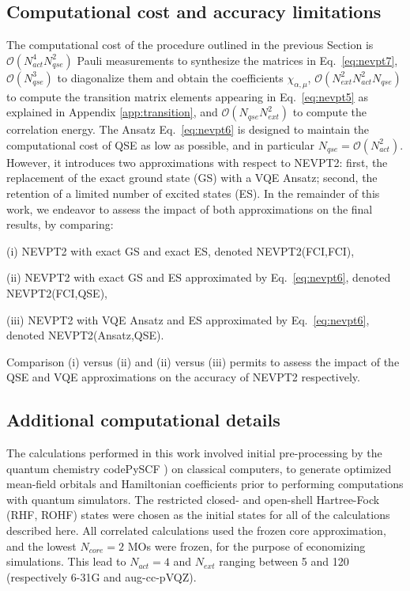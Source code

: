 \documentclass[aps,pra,twocolumn]{revtex4-2}
\begin{document}
\subsection{Computational cost and accuracy limitations}

The computational cost of the procedure outlined in the previous Section is 
$\mathcal{O}(N_{act}^4 N_{qse}^2)$ Pauli measurements to synthesize the matrices in Eq.~\eqref{eq:nevpt7},
$\mathcal{O}(N_{qse}^3)$ to diagonalize them and obtain the coefficients $\chi_{\alpha,\mu}$, 
$\mathcal{O}(N^2_{ext} N^2_{act} N_{qse})$ to compute the transition matrix elements appearing in Eq.~\eqref{eq:nevpt5} as explained in Appendix \ref{app:transition}, 
and $\mathcal{O}(N_{qse} N_{ext}^2)$ to compute the correlation energy. 
The Ansatz Eq.~\eqref{eq:nevpt6} is designed to maintain the computational cost of QSE as low as possible, and in particular $N_{qse} = \mathcal{O}(N_{act}^2)$.
However, it introduces two approximations with respect to NEVPT2: 
first, the replacement of the exact ground state (GS) with a VQE Ansatz; second, the retention of a limited number of excited states (ES).
In the remainder of this work, we endeavor to assess the impact of both approximations on the final results, by comparing:

(i) NEVPT2 with exact GS and exact ES, denoted NEVPT2(FCI,FCI), 

(ii) NEVPT2 with exact GS and ES approximated by Eq.~\eqref{eq:nevpt6}, denoted NEVPT2(FCI,QSE), 

(iii) NEVPT2 with VQE Ansatz and ES approximated by Eq.~\eqref{eq:nevpt6}, denoted NEVPT2(Ansatz,QSE).

Comparison (i) versus (ii) and (ii) versus (iii) permits to assess the impact of the QSE and VQE approximations on the accuracy of NEVPT2 respectively.

\subsection{Additional computational details}

The calculations performed in this work involved initial pre-processing by the quantum chemistry codePySCF \cite{sun2018pyscf,sun2020recent}) 
on classical computers, to generate optimized mean-field orbitals and Hamiltonian coefficients prior to performing computations with quantum simulators. 
The restricted closed- and open-shell Hartree-Fock (RHF, ROHF) states were chosen as the initial states for all of the calculations described here. 
All correlated calculations used the frozen core approximation, and the lowest $N_{core}=2$ MOs were frozen, for the purpose of economizing simulations.
This lead to $N_{act} = 4$ and $N_{ext}$ ranging between 5 and 120 (respectively 6-31G and aug-cc-pVQZ).
\end{document}
